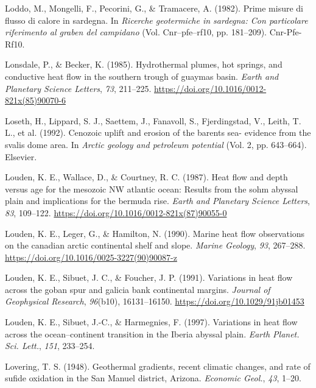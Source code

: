 \begin{CSLReferences}{1}{1}
\leavevmode{}%
Loddo, M., Mongelli, F., Pecorini, G., \& Tramacere, A. (1982). Prime misure di flusso di calore in sardegna. In \emph{Ricerche geotermiche in sardegna: Con particolare riferimento al graben del campidano} (Vol. Cnr--pfe--rf10, pp. 181--209). Cnr-Pfe-Rf10.

\leavevmode{}%
Lonsdale, P., \& Becker, K. (1985). Hydrothermal plumes, hot springs, and conductive heat flow in the southern trough of guaymas basin. \emph{Earth and Planetary Science Letters}, \emph{73}, 211--225. \url{https://doi.org/10.1016/0012-821x(85)90070-6}

\leavevmode{}%
Loseth, H., Lippard, S. J., Saettem, J., Fanavoll, S., Fjerdingstad, V., Leith, T. L., et al. (1992). Cenozoic uplift and erosion of the barents sea- evidence from the svalis dome area. In \emph{Arctic geology and petroleum potential} (Vol. 2, pp. 643--664). Elsevier.

\leavevmode{}%
Louden, K. E., Wallace, D., \& Courtney, R. C. (1987). Heat flow and depth versus age for the mesozoic NW atlantic ocean: Results from the sohm abyssal plain and implications for the bermuda rise. \emph{Earth and Planetary Science Letters}, \emph{83}, 109--122. \url{https://doi.org/10.1016/0012-821x(87)90055-0}

\leavevmode{}%
Louden, K. E., Leger, G., \& Hamilton, N. (1990). Marine heat flow observations on the canadian arctic continental shelf and slope. \emph{Marine Geology}, \emph{93}, 267--288. \url{https://doi.org/10.1016/0025-3227(90)90087-z}

\leavevmode{}%
Louden, K. E., Sibuet, J. C., \& Foucher, J. P. (1991). Variations in heat flow across the goban spur and galicia bank continental margins. \emph{Journal of Geophysical Research}, \emph{96}(b10), 16131--16150. \url{https://doi.org/10.1029/91jb01453}

\leavevmode{}%
Louden, K. E., Sibuet, J.-C., \& Harmegnies, F. (1997). Variations in heat flow across the ocean--continent transition in the {Iberia} abyssal plain. \emph{Earth Planet. Sci. Lett.}, \emph{151}, 233--254.

\leavevmode{}%
Lovering, T. S. (1948). Geothermal gradients, recent climatic changes, and rate of sufide oxidation in the {San Manuel} district, {Arizona}. \emph{Economic Geol.}, \emph{43}, 1--20.


\end{CSLReferences}
